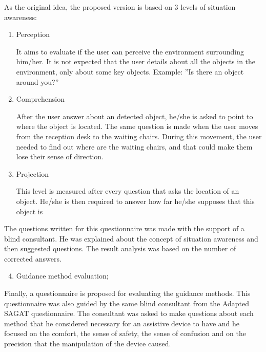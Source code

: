         As the original idea, the proposed version is based on 3 levels of situation awareness:

        \begin{enumerate}[leftmargin = 6em, label = Level \arabic* -- ]
            \item Perception
            
            It aims to evaluate if the user can perceive the environment surrounding him/her. It is not expected that the user details about all the objects in the environment, only about some key objects. Example: ”Is there an object around you?”

            \item Comprehension
    
            After the user answer about an detected object, he/she is asked to point to where the object is located. The same question is made when the user moves from the reception desk to the waiting chairs. During this movement, the user needed to find out where are the waiting chairs, and that could make them lose their sense of direction.
    
            \item Projection
            
            This level is measured after every question that asks the location of an object. He/she is then required to answer how far he/she supposes that this object is
            
        \end{enumerate}      

        The questions written for this questionnaire was made with the support of a blind consultant. He was explained about the concept of situation awareness and then suggested questions. The result analysis was based on the number of corrected answers.

        \begin{enumerate} [label = \Alph*)]
            \setcounter{enumi}{3}
            \item Guidance method evaluation;
        \end{enumerate}

        Finally, a questionnaire is proposed for evaluating the guidance methods. This questionnaire was also guided by the same blind consultant from the Adapted SAGAT questionnaire. The consultant was asked to make questions about each method that he considered necessary for an assistive device to have and he focused on the comfort, the sense of safety, the sense of confusion and on the precision that the manipulation of the device caused.
        
